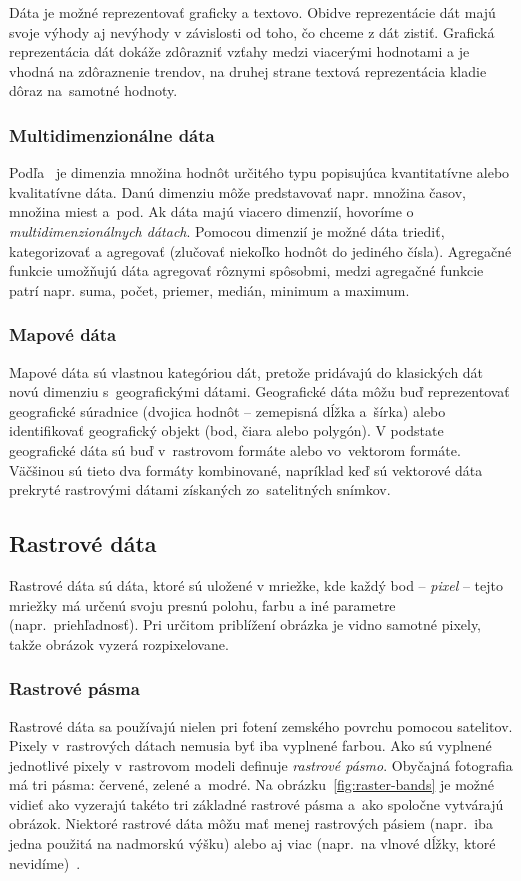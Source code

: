 Dáta je možné reprezentovať graficky a textovo. Obidve reprezentácie dát majú svoje výhody aj nevýhody v závislosti od toho, čo chceme z dát zistiť. Grafická reprezentácia dát dokáže zdôrazniť vzťahy medzi viacerými hodnotami a je vhodná na zdôraznenie trendov, na druhej strane textová reprezentácia kladie dôraz na~samotné hodnoty.

\subsubsection{Multidimenzionálne dáta}
Podľa~\cite{hynek2021webvisual} je dimenzia množina hodnôt určitého typu popisujúca kvantitatívne alebo kvalitatívne dáta. Danú dimenziu môže predstavovať napr. množina časov, množina miest a~pod. Ak dáta majú viacero dimenzií, hovoríme o \emph{multidimenzionálnych dátach}. Pomocou dimenzií je možné dáta triediť, kategorizovať a agregovať (zlučovať niekoľko hodnôt do jediného čísla). Agregačné funkcie umožňujú dáta agregovať rôznymi spôsobmi, medzi agregačné funkcie patrí napr. suma, počet, priemer, medián, minimum a maximum.

\subsubsection{Mapové dáta}
Mapové dáta sú vlastnou kategóriou dát, pretože pridávajú do klasických dát novú dimenziu s~geografickými dátami. Geografické dáta môžu buď reprezentovať geografické súradnice (dvojica hodnôt \--- zemepisná dĺžka a~šírka) alebo identifikovať geografický objekt (bod, čiara alebo polygón). V podstate geografické dáta sú buď v~rastrovom formáte alebo vo~vektorom formáte. Väčšinou sú tieto dva formáty kombinované, napríklad keď sú vektorové dáta prekryté rastrovými dátami získaných zo~satelitných snímkov.

\subsection{Rastrové dáta}
Rastrové dáta sú dáta, ktoré sú uložené v mriežke, kde každý bod \--- \emph{pixel} \--- tejto mriežky má určenú svoju presnú polohu, farbu a iné parametre (napr.~priehľadnosť). Pri určitom priblížení obrázka je vidno samotné pixely, takže obrázok vyzerá rozpixelovane. 

\subsubsection{Rastrové pásma}
Rastrové dáta sa používajú nielen pri fotení zemského povrchu pomocou satelitov. Pixely v~rastrových dátach nemusia byť iba vyplnené farbou. Ako sú vyplnené jednotlivé pixely v~rastrovom modeli definuje \emph{rastrové pásmo}. Obyčajná fotografia má tri pásma: červené, zelené a~modré. Na obrázku~\ref{fig:raster-bands} je možné vidieť ako vyzerajú takéto tri základné rastrové pásma a~ako spoločne vytvárajú obrázok. Niektoré rastrové dáta môžu mať menej rastrových pásiem (napr.~iba jedna použitá na nadmorskú výšku) alebo aj viac (napr.~na vlnové dĺžky, ktoré nevidíme)~\cite{bolstad2019GIS}.

